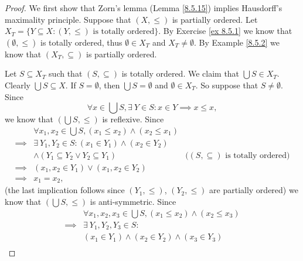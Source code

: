 \begin{proof}
    We first show that Zorn's lemma (Lemma \ref{8.5.15}) implies Hausdorff's maximality principle.
    Suppose that \((X, \leq)\) is partially ordered.
    Let \(X_T = \{Y \subseteq X : (Y, \leq) \text{ is totally ordered}\}\).
    By Exercise \ref{ex 8.5.1} we know that \((\emptyset, \leq)\) is totally ordered, thus \(\emptyset \in X_T\) and \(X_T \neq \emptyset\).
    By Example \ref{8.5.2} we know that \((X_T, \subseteq)\) is partially ordered.

    Let \(S \subseteq X_T\) such that \((S, \subseteq)\) is totally ordered.
    We claim that \(\bigcup S \in X_T\).
    Clearly \(\bigcup S \subseteq X\).
    If \(S = \emptyset\), then \(\bigcup S = \emptyset\) and \(\emptyset \in X_T\).
    So suppose that \(S \neq \emptyset\).
    Since
    \[
        \forall x \in \bigcup S, \exists\ Y \in S : x \in Y \implies x \leq x,
    \]
    we know that \((\bigcup S, \leq)\) is reflexive.
    Since
    \begin{align*}
                 & \forall x_1, x_2 \in \bigcup S, (x_1 \leq x_2) \land (x_2 \leq x_1)                                                  \\
        \implies & \exists\ Y_1, Y_2 \in S : (x_1 \in Y_1) \land (x_2 \in Y_2)                                                          \\
                 & \land (Y_1 \subseteq Y_2 \lor Y_2 \subseteq Y_1)                    & \text{(\((S, \subseteq)\) is totally ordered)} \\
        \implies & (x_1, x_2 \in Y_1) \lor (x_1, x_2 \in Y_2)                                                                           \\
        \implies & x_1 = x_2,
    \end{align*}
    (the last implication follows since \((Y_1, \leq)\), \((Y_2, \leq)\) are partially ordered)
    we know that \((\bigcup S, \leq)\) is anti-symmetric.
    Since
    \begin{align*}
                 & \forall x_1, x_2, x_3 \in \bigcup S, (x_1 \leq x_2) \land (x_2 \leq x_3)                                                           \\
        \implies & \exists\ Y_1, Y_2, Y_3 \in S :                                                                                                     \\
                 & (x_1 \in Y_1) \land (x_2 \in Y_2) \land (x_3 \in Y_3)                                                                              \\

\end{align*}
\end{proof}
